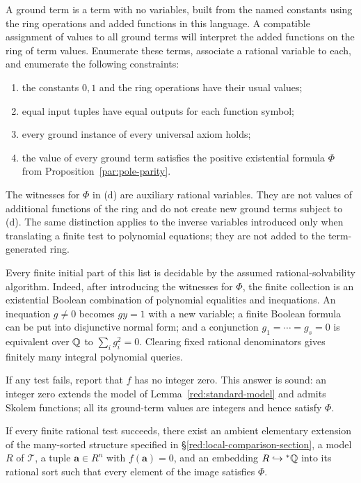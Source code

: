 A ground term is a term with no variables, built from the named constants
using the ring operations and added functions in this language. A compatible
assignment of values to all ground terms will interpret the added functions
on the ring of term values. Enumerate these terms, associate a rational
variable to each, and enumerate the following constraints:
\begin{enumerate}[label=(\alph*),leftmargin=*]
\item the constants $0,1$ and the ring operations have their usual values;
\item equal input tuples have equal outputs for each function symbol;
\item every ground instance of every universal axiom holds;
\item the value of every ground term satisfies the positive existential
formula $\Phi$ from Proposition~\ref{par:pole-parity}.
\end{enumerate}
The witnesses for $\Phi$ in (d) are auxiliary rational variables.
They are not values of additional functions of the ring and do not create
new ground terms subject to (d). The same distinction applies to the
inverse variables introduced only when translating a finite test to
polynomial equations; they are not added to the term-generated ring.

Every finite initial part of this list is decidable by the assumed
rational-solvability algorithm. Indeed, after introducing the witnesses
for $\Phi$, the finite collection is an existential Boolean combination
of polynomial equalities and inequations. An inequation $g\ne0$ becomes
$gy=1$ with a new variable; a finite Boolean formula can be put into
disjunctive normal form; and a conjunction $g_1=\cdots=g_s=0$ is
equivalent over $\mathbb Q$ to $\sum_i g_i^2=0$. Clearing fixed rational
denominators gives finitely many integral polynomial queries.

If any test fails, report that $f$ has no integer zero. This answer is
sound: an integer zero extends the model of Lemma~\ref{red:standard-model}
and admits Skolem functions; all its ground-term values are integers
and hence satisfy $\Phi$.

\begin{lemma}\label{red:compactness}
If every finite rational test succeeds, there exist an ambient
elementary extension of the many-sorted structure specified in
\S\ref{red:local-comparison-section}, a
model \(R\) of \(\mathcal T\), a tuple \(\mathbf a\in R^n\) with
\(f(\mathbf a)=0\), and an embedding \(R\hookrightarrow{}^*\mathbb Q\)
into its rational sort such that every element of the image satisfies
\(\Phi\).
\end{lemma}

